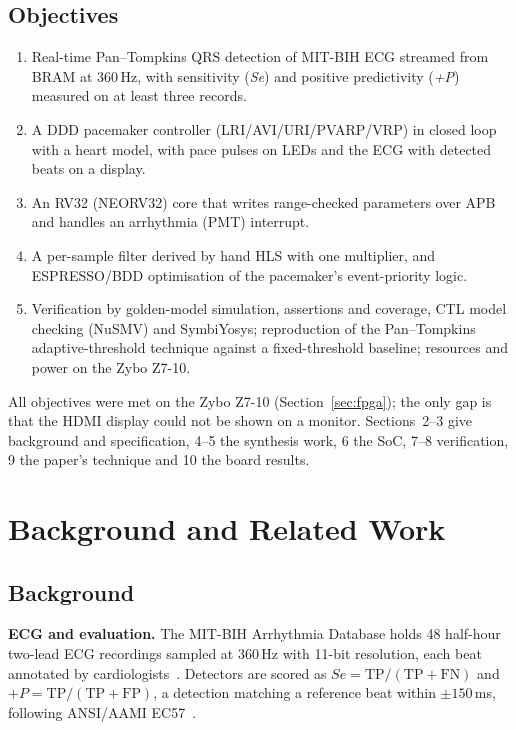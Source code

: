 \documentclass[11pt,a4paper]{article}
\newcommand{\Se}{\textit{Se}}
\newcommand{\Pp}{\textit{+P}}
\begin{document}
\subsection{Objectives}
\begin{enumerate}
  \item Real-time Pan--Tompkins QRS detection of MIT-BIH ECG streamed from BRAM at 360\,Hz, with
        sensitivity (\Se) and positive predictivity (\Pp) measured on at least three records.
  \item A DDD pacemaker controller (LRI/AVI/URI/PVARP/VRP) in closed loop with a heart model, with
        pace pulses on LEDs and the ECG with detected beats on a display.
  \item An RV32 (NEORV32) core that writes range-checked parameters over APB and handles an
        arrhythmia (PMT) interrupt.
  \item A per-sample filter derived by hand HLS with one multiplier, and ESPRESSO/BDD optimisation of
        the pacemaker's event-priority logic.
  \item Verification by golden-model simulation, assertions and coverage, CTL model checking (NuSMV)
        and SymbiYosys; reproduction of the Pan--Tompkins adaptive-threshold technique against a
        fixed-threshold baseline; resources and power on the Zybo Z7-10.
\end{enumerate}
All objectives were met on the Zybo Z7-10 (Section~\ref{sec:fpga}); the only gap is that the HDMI
display could not be shown on a monitor. Sections~2--3 give background and specification, 4--5 the
synthesis work, 6 the SoC, 7--8 verification, 9 the paper's technique and 10 the board results.

\section{Background and Related Work}
\label{sec:related}
\subsection{Background}
\textbf{ECG and evaluation.} The MIT-BIH Arrhythmia Database holds 48 half-hour two-lead ECG
recordings sampled at 360\,Hz with 11-bit resolution, each beat annotated by
cardiologists~\cite{moody,goldberger}. Detectors are scored as $\Se=\mathrm{TP}/(\mathrm{TP}+\mathrm{FN})$
and $\Pp=\mathrm{TP}/(\mathrm{TP}+\mathrm{FP})$, a detection matching a reference beat within
$\pm150$\,ms, following ANSI/AAMI EC57~\cite{ec57}.
\end{document}
